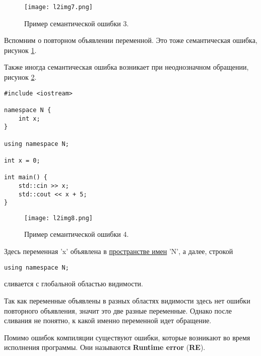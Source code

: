 \begin{figure}[h]
    \centering
    \texttt{[image: l2img7.png]}
    \caption{Пример семантической ошибки 3.}
    \label{l2img7}
\end{figure}

Вспомним о повторном объявлении переменной. Это тоже семантическая ошибка, рисунок \ref{l2img7}.

Также иногда семантическая ошибка возникает при неоднозначном обращении, рисунок \ref{l2img8}.

\begin{verbatim}
#include <iostream>

namespace N {
    int x;
}

using namespace N;

int x = 0;

int main() {
    std::cin >> x;
    std::cout << x + 5;
}
\end{verbatim}

\begin{figure}[h]
    \centering
    \texttt{[image: l2img8.png]}
    \caption{Пример семантической ошибки 4.}
    \label{l2img8}
\end{figure}

Здесь переменная 'x' объявлена в \underline{пространстве имен} 'N', а далее, строкой

\begin{verbatim}
using namespace N;
\end{verbatim}

сливается с глобальной областью видимости.

Так как переменные объявлены в разных областях видимости здесь нет ошибки повторного объявления,
значит это две разные переменные. Однако после сливания не понятно, к какой именно переменной идет обращение.


Помимо ошибок компиляции существуют ошибки, которые возникают во время исполнения программы.
Они называются \textbf{Runtime error} (\textbf{RE}).